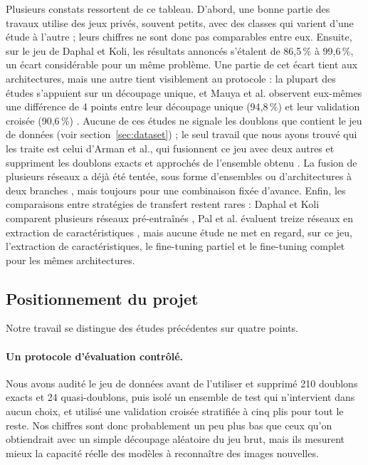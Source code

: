Plusieurs constats ressortent de ce tableau. D'abord, une bonne partie des travaux utilise des jeux privés, souvent petits, avec des classes qui varient d'une étude à l'autre ; leurs chiffres ne sont donc pas comparables entre eux. Ensuite, sur le jeu de Daphal et Koli, les résultats annoncés s'étalent de 86,5\,\% à 99,6\,\%, un écart considérable pour un même problème. Une partie de cet écart tient aux architectures, mais une autre tient visiblement au protocole : la plupart des études s'appuient sur un découpage unique, et Mauya et al. observent eux-mêmes une différence de 4 points entre leur découpage unique (94,8\,\%) et leur validation croisée (90,6\,\%) \cite{mauya2025improved}. Aucune de ces études ne signale les doublons que contient le jeu de données (voir section~\ref{sec:dataset}) ; le seul travail que nous ayons trouvé qui les traite est celui d'Arman et al., qui fusionnent ce jeu avec deux autres et suppriment les doublons exacts et approchés de l'ensemble obtenu \cite{arman2025sugarcaneshufflenet}. La fusion de plusieurs réseaux a déjà été tentée, sous forme d'ensembles \cite{daphal2023enhancing, talukder2025sugarcanenet} ou d'architectures à deux branches \cite{ahmed2025agrihafnet, wadhawan2026multiscale}, mais toujours pour une combinaison fixée d'avance. Enfin, les comparaisons entre stratégies de transfert restent rares : Daphal et Koli comparent plusieurs réseaux pré-entraînés \cite{daphal2023enhancing}, Pal et al. évaluent treize réseaux en extraction de caractéristiques \cite{pal2025lightweight}, mais aucune étude ne met en regard, sur ce jeu, l'extraction de caractéristiques, le fine-tuning partiel et le fine-tuning complet pour les mêmes architectures.

\subsection{Positionnement du projet}

Notre travail se distingue des études précédentes sur quatre points.

\paragraph{Un protocole d'évaluation contrôlé.} Nous avons audité le jeu de données avant de l'utiliser et supprimé 210 doublons exacts et 24 quasi-doublons, puis isolé un ensemble de test qui n'intervient dans aucun choix, et utilisé une validation croisée stratifiée à cinq plis pour tout le reste. Nos chiffres sont donc probablement un peu plus bas que ceux qu'on obtiendrait avec un simple découpage aléatoire du jeu brut, mais ils mesurent mieux la capacité réelle des modèles à reconnaître des images nouvelles.

